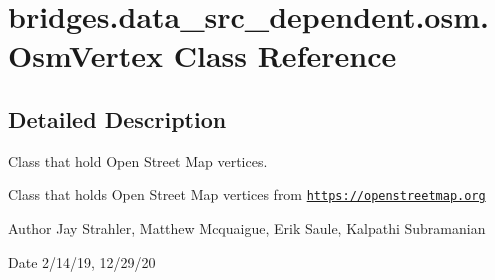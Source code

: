 \hypertarget{classbridges_1_1data__src__dependent_1_1osm_1_1_osm_vertex}{}\section{bridges.\+data\+\_\+src\+\_\+dependent.\+osm.\+Osm\+Vertex Class Reference}
\label{classbridges_1_1data__src__dependent_1_1osm_1_1_osm_vertex}


\subsection{Detailed Description}
Class that hold Open Street Map vertices. 

Class that holds Open Street Map vertices from \href{https://openstreetmap.org}{\tt https\+://openstreetmap.\+org}

\begin{DoxyAuthor}{Author}
Jay Strahler, Matthew Mcquaigue, Erik Saule, Kalpathi Subramanian 
\end{DoxyAuthor}
\begin{DoxyDate}{Date}
2/14/19, 12/29/20 
\end{DoxyDate}
